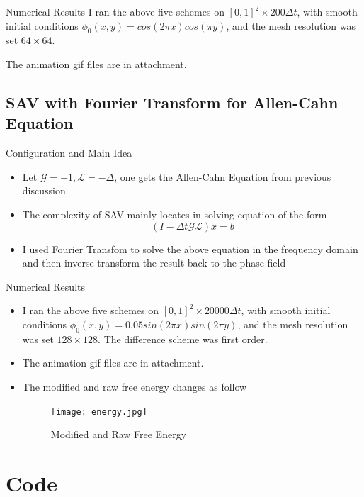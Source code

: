 \documentclass[9pt]{beamer}
\begin{document}
\begin{frame}{Numerical Results}
I ran the above five schemes on $[0,1]^2 \times 200\Delta t $, with smooth initial conditions $\phi_0(x,y) = cos(2\pi x)cos(\pi y)$, and the mesh resolution was set $64\times64$.

The animation gif files are in attachment.
\end{frame}

\subsection{SAV with Fourier Transform for Allen-Cahn Equation}
\begin{frame}{Configuration and Main Idea}
\begin{itemize}
\item{Let $\mathcal G=-1, \mathcal L = -\Delta$, one gets the Allen-Cahn Equation from previous discussion}\item{The complexity of SAV mainly locates in solving equation of the form $$(I-\Delta t \mathcal{G L}) x = b$$}\item{I used Fourier Transfom to solve the above equation in the frequency domain and then inverse transform the result back to the phase field}
\end{itemize}
\end{frame}

\begin{frame}{Numerical Results}
\begin{itemize}
\item{I ran the above five schemes on $[0,1]^2 \times 20000\Delta t $, with smooth initial conditions $\phi_0(x,y) = 0.05 sin(2\pi x)sin(2\pi y)$, and the mesh resolution was set $128\times128$. The difference scheme was first order.}
\item{
The animation gif files are in attachment.}
\item{
The modified and raw free energy changes as follow
 \begin{figure}[H]
  \centering
  \texttt{[image: energy.jpg]}
 \caption{Modified and Raw Free Energy}
 \label{fig:1}
\end{figure}}
\end{itemize}
\end{frame}

\section{Code}
\end{document}
